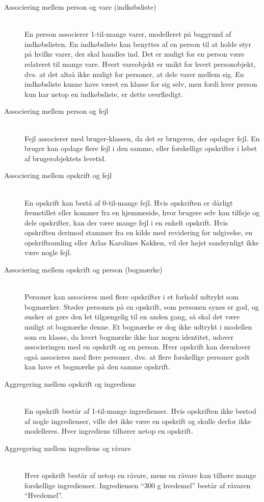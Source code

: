 \begin{description}

\item[Associering mellem person og vare (indkøbsliste)] \hfill \\
En person associerer 1-til-mange varer, modelleret på baggrund af indkøbslisten. En indkøbsliste kan benyttes af en person til at holde styr på hvilke varer, der skal handles ind.  Det er muligt for en person være relateret til mange vare. Hvert vareobjekt er unikt for hvert personobjekt, dvs. at det altså ikke muligt for personer, at dele varer mellem sig. En indkøbsliste kunne have været en klasse for sig selv, men fordi hver person kun har netop en indkøbsliste, er dette overflødigt.

\item[Associering mellem person og fejl] \hfill \\
Fejl associerer med bruger-klassen, da det er brugeren, der opdager fejl. En bruger kan opdage flere fejl i den samme, eller forskellige opskrifter i løbet af brugerobjektets levetid.

\item[Associering mellem opskrift og fejl] \hfill \\
En opskrift kan bestå af 0-til-mange fejl. Hvis opskriften er dårligt fremstillet eller kommer fra en hjemmeside, hvor brugere selv kan tilføje og dele opskrifter, kan der \fx være mange fejl i en enkelt opskrift. Hvis opskriften derimod stammer fra en kilde med revidering før udgivelse, \fx en opskriftsamling eller Arlas Karolines Køkken, vil der højst sandsynligt ikke være nogle fejl. 

\item[Associering mellem opskrift og person (bogmærke)] \hfill \\
Personer kan associeres med flere opskrifter i et forhold udtrykt som bogmærker. Støder personen på en opskrift, som personen synes er god, og ønsker at gøre den let tilgængelig til en anden gang, så skal det være muligt at bogmærke denne. Et bogmærke er dog ikke udtrykt i modellen som en klasse, da hvert bogmærke ikke har nogen identitet, udover associeringen med en opskrift og en person. Hver opskrift kan derudover også associeres med flere personer, dvs. at flere forskellige personer godt kan have et bogmærke på den samme opskrift. 

\item[Aggregering mellem opskrift og ingrediens] \hfill \\
En opskrift består af 1-til-mange ingredienser. Hvis opskriften ikke bestod af nogle ingredienser, ville det ikke være en opskrift og skulle derfor ikke modelleres. Hver ingrediens tilhører netop en opskrift.

\item[Aggregering mellem ingrediens og råvare] \hfill \\
Hver opskrift består af netop en råvare, mens en råvare kan tilhøre mange forskellige ingredienser. Ingrediensen ``300 g hvedemel'' består \fx af råvaren ``Hvedemel''.

\end{description}

